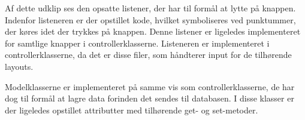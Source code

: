 \noindent
Af dette udklip ses den opsatte listener, der har til formål at lytte på knappen. Indenfor listeneren er der opstillet kode, hvilket symboliseres ved punktummer, der køres idet der trykkes på knappen. Denne listener er ligeledes implementeret for samtlige knapper i controllerklasserne. Listeneren er implementeret i controllerklasserne, da det er disse filer, som håndterer input for de tilhørende layouts.

Modelklasserne er implementeret på samme vis som controllerklasserne, de har dog til formål at lagre data forinden det sendes til databasen. I disse klasser er der ligeledes opstillet attributter med tilhørende get- og set-metoder. 

